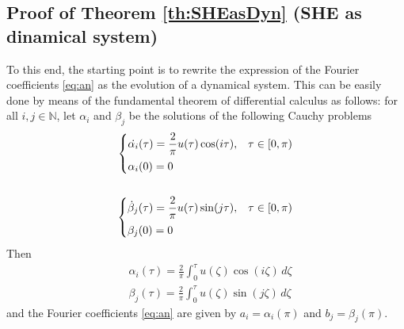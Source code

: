 
\subsection{Proof of Theorem \ref{th:SHEasDyn} (SHE as dinamical system)}


To this end, the starting point is to rewrite the expression of the Fourier coefficients \eqref{eq:an} as the evolution of a dynamical system. This can be easily done by means of the fundamental theorem of differential calculus as follows: for all $i,j\in\mathbb{N}$, let $\alpha_i$ and $\beta_j$ be the solutions of the following Cauchy problems
\begin{align}\label{eq:Cauchy}
	\begin{cases} 
		\displaystyle\dot{\alpha_i}(\tau)  = \frac{2}{\pi}u(\tau)\cos(i\tau), & \tau\in [0,\pi) 
		\\[6pt]  
		\alpha_i(0)  = 0       
	\end{cases} \notag 
	\\
	\\
	\begin{cases} 
		\displaystyle\dot{\beta}_j(\tau)  = \frac{2}{\pi}u(\tau)\sin(j\tau), & \tau\in [0,\pi) 
		\\[6pt]  
		\beta_j(0) = 0       
	\end{cases}\notag
\end{align}
Then 
\begin{align*}
	&\alpha_i(\tau)= \frac{2}{\pi}\int_0^\tau u(\zeta) \cos(i\zeta)\,d\zeta 
	\\[5pt]
	&\beta_j(\tau) = \frac{2}{\pi}\int_0^\tau u(\zeta) \sin(j\zeta)\,d\zeta 
\end{align*}
and the Fourier coefficients \eqref{eq:an} are given by $a_i=\alpha_i(\pi)$ and $b_j=\beta_j(\pi)$.  

